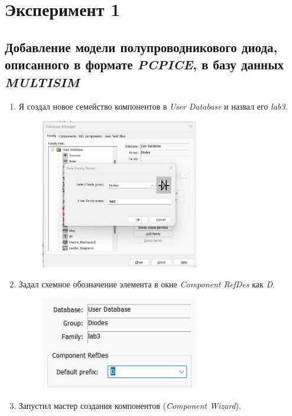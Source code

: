\chapter{Эксперимент 1}
\section*{Добавление модели полупроводникового диода, описанного в формате \textit{PCPICE}, в базу данных \textit{MULTISIM}}

\begin{enumerate}
	\item Я создал новое семейство компонентов в \textit{User Database} и назвал его \textit{lab3}.
	\begin{figure}[H]
		\centering
		\includegraphics[width=0.65\textwidth]{img/01.jpg}
	\end{figure}
	\item Задал схемное обозначение элемента в окне \textit{Component RefDes} как \textit{D}.
	\begin{figure}[H]
		\centering
		\includegraphics[width=0.65\textwidth]{img/02.jpg}
	\end{figure}
	\newpage
	\item Запустил мастер создания компонентов (\textit{Component Wizard}).

\end{enumerate}
